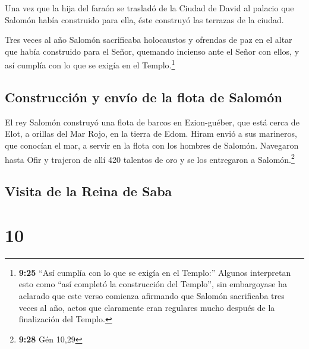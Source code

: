  Una vez que la hija del faraón se trasladó de la Ciudad
de David al palacio que Salomón había construido para ella, éste
construyó las terrazas de la ciudad.

 Tres veces al año Salomón sacrificaba holocaustos y
ofrendas de paz en el altar que había construido para el Señor, quemando
incienso ante el Señor con ellos, y así cumplía con lo que se exigía en
el Templo.\footnote{\textbf{9:25} ``Así cumplía con lo que se exigía en
  el Templo:'' Algunos interpretan esto como ``así completó la
  construcción del Templo'', sin embargoyase ha aclarado que este verso
  comienza afirmando que Salomón sacrificaba tres veces al año, actos
  que claramente eran regulares mucho después de la finalización del
  Templo.}

\hypertarget{construcciuxf3n-y-envuxedo-de-la-flota-de-salomuxf3n}{%
\subsection{Construcción y envío de la flota de
Salomón}\label{construcciuxf3n-y-envuxedo-de-la-flota-de-salomuxf3n}}

 El rey Salomón construyó una flota de barcos en
Ezion-guéber, que está cerca de Elot, a orillas del Mar Rojo, en la
tierra de Edom.  Hiram envió a sus marineros, que
conocían el mar, a servir en la flota con los hombres de Salomón.
 Navegaron hasta Ofir y trajeron de allí 420 talentos de
oro y se los entregaron a Salomón.\footnote{\textbf{9:28} Gén 10,29}

\hypertarget{visita-de-la-reina-de-saba}{%
\subsection{Visita de la Reina de
Saba}\label{visita-de-la-reina-de-saba}}

\hypertarget{section-9}{%
\section{10}\label{section-9}}

